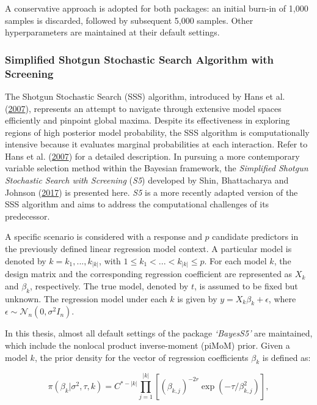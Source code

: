 \documentclass[
  11pt,
]{article}
\begin{document}
A conservative approach is adopted for both packages: an initial burn-in
of 1,000 samples is discarded, followed by subsequent 5,000 samples.
Other hyperparameters are maintained at their default settings.

\subsubsection{Simplified Shotgun Stochastic Search Algorithm with Screening}

The Shotgun Stochastic Search (SSS) algorithm, introduced by Hans et al.
(\protect\hyperlink{ref-Hans2007}{2007}), represents an attempt to
navigate through extensive model spaces efficiently and pinpoint global
maxima. Despite its effectiveness in exploring regions of high posterior
model probability, the SSS algorithm is computationally intensive
because it evaluates marginal probabilities at each interaction. Refer
to Hans et al. (\protect\hyperlink{ref-Hans2007}{2007}) for a detailed
description. In pursuing a more contemporary variable selection method
within the Bayesian framework, the \emph{Simplified Shotgun Stochastic
Search with Screening} (\emph{S5}) developed by Shin, Bhattacharya and
Johnson (\protect\hyperlink{ref-Shin2018}{2017}) is presented here.
\emph{S5} is a more recently adapted version of the SSS algorithm and
aims to address the computational challenges of its predecessor.

A specific scenario is considered with a response and \(p\) candidate
predictors in the previously defined linear regression model context. A
particular model is denoted by \(k = {k_1, ..., k_{|k|}}\), with
\(1 \leq k_1 < ...< k_{|k|} \leq p\). For each model \(k\), the design
matrix and the corresponding regression coefficient are represented as
\(X_k\) and \(\beta_k\), respectively. The true model, denoted by \(t\),
is assumed to be fixed but unknown. The regression model under each
\(k\) is given by \(y = X_k\beta_k + \epsilon\), where
\(\epsilon \sim \mathcal{N}_n(0, \sigma^2I_n)\).

In this thesis, almost all default settings of the package
\emph{`BayesS5'} are maintained, which include the nonlocal product
inverse-moment (piMoM) prior. Given a model \(k\), the prior density for
the vector of regression coefficients \(\beta_k\) is defined as:

\begin{equation}
\pi(\beta_k | \sigma^2, \tau, k) = C^{*-|k|} \prod_{j=1}^{|k|} [(\beta_{k,j})^{-2r} \exp({-\tau/\beta_{k,j}^2})],
\end{equation}
\end{document}
